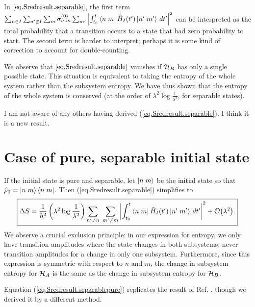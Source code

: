 In \(\ref{eq.Sredresult.separable}\), the first term \(\sum_{n\in I}\sum_{n^\prime \not\in I}\sum_m \sigma_{n,m}^{(0)} \sum_{m^\prime} \left|\int_{t_0}^t \left\langle n\;m\right|\hat{H}_I (t^{\prime})\left|n^\prime\;m^\prime\right\rangle \,dt^{\prime}\right|^2\) can be interpreted as the total probability that a transition occurs to a state that had zero probability to start. The second term is harder to interpret; perhaps it is some kind of correction to account for double-counting.

We observe that \(\ref{eq.Sredresult.separable}\) vanishes if \(\mathcal{H}_B\) has only a single possible state. This situation is equivalent to taking the entropy of the whole system rather than the subsystem entropy. We have thus shown that the entropy of the whole system is conserved (at the order of \(\lambda^2 \log\frac{1}{\lambda^2}\), for separable states).

I am not aware of any others having derived (\ref{eq.Sredresult.separable}). I think it is a new result.


\section{Case of pure, separable initial state}\label{sec.purestate}

If the initial state is pure and separable, let \(\left|n\;m\right\rangle\) be the initial state so that \(\hat{\rho}_0 = \left|n\;m\right\rangle\left\langle n\;m\right|\). Then (\ref{eq.Sredresult.separable}) simplifies to
\begin{equation}\label{eq.Sredresult.separablepure}
\boxed{\Delta S =\frac{1}{\hbar^2}\left(\lambda^2 \log\frac{1}{\lambda^2}\right) \sum_{n^\prime\neq n} \;\sum_{m^\prime\neq m} \left|\int_{t_0}^t \left\langle n\;m\right| \hat{H}_I (t^{\prime})\left|n^\prime\;m^\prime\right\rangle \,dt^{\prime}\right|^2 + \mathcal{O}{\left(\lambda^2\right)}.}
\end{equation}
We observe a crucial exclusion principle: in our expression for entropy, we only have transition amplitudes where the state changes in both subsystems, never transition amplitudes for a change in only one subsystem. Furthermore, since this expression is symmetric with respect to \(n\) and \(m\), the change in subsystem entropy for \(\mathcal{H}_A\) is the same as the change in subsystem entropy for \(\mathcal{H}_B\).

Equation (\ref{eq.Sredresult.separablepure}) replicates the result of Ref. \cite{seki}, though we derived it by a different method.
